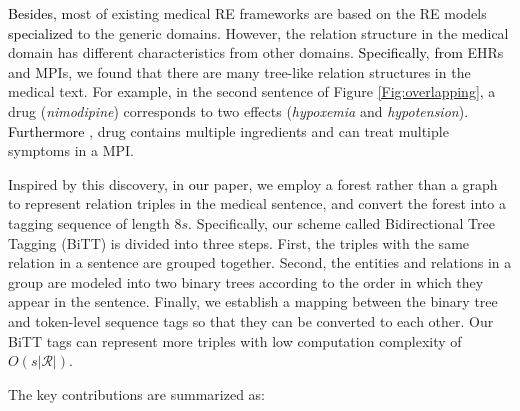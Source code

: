 \documentclass[conference]{IEEEtran}
\newcommand{\yankun}[1]{\textcolor{black}{#1}}
\begin{document}
\yankun{Besides, m}ost of 
existing medical RE frameworks are based on the RE models 
\yankun{specialized}
to the generic domains. However, the relation structure in the medical domain has different characteristics from other domains. \yankun{Specifically}, 
\yankun{from }EHRs and MPIs, we found that there are many tree-like relation structures in the medical text. For example, in the second sentence of Figure \ref{Fig:overlapping}, a drug (\emph{nimodipine}) corresponds to two effects (\emph{hypoxemia} and \emph{hypotension}). 
\yankun{Furthermore}
, drug contains multiple ingredients and can treat multiple symptoms in a MPI. 

Inspired by this discovery, in 
\yankun{our }paper, we employ a forest rather than a graph to represent relation triples in the medical sentence, and convert the forest into a tagging sequence of length $8s$. Specifically, our scheme called Bidirectional Tree Tagging (BiTT) is divided into three steps. First, the triples with the same relation in a sentence are grouped together. Second, the entities and relations in a group are modeled into two binary trees according to the order in which they appear in the sentence. Finally, we establish a mapping between the binary tree and token-level sequence tags so that they can be converted to each other. Our BiTT tags can represent more triples with low computation complexity of $O(s|\mathcal{R}|)$.


The key contributions are summarized as:
\end{document}
